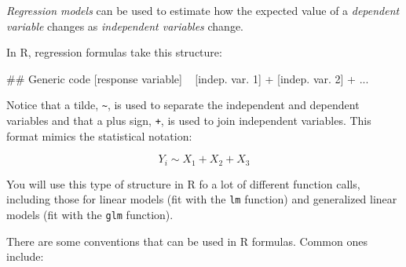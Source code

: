 \documentclass[]{book}
\makeatletter
\newenvironment{Shaded}{\begin{snugshade}}{\end{snugshade}}
\newcommand{\DecValTok}[1]{\textcolor[rgb]{0.00,0.00,0.81}{{#1}}}
\newcommand{\StringTok}[1]{\textcolor[rgb]{0.31,0.60,0.02}{{#1}}}
\newcommand{\NormalTok}[1]{{#1}}
\newenvironment{kframe}{%
\medskip{}
\setlength{\fboxsep}{.8em}
 \def\at@end@of@kframe{}%
 \ifinner\ifhmode%
  \def\at@end@of@kframe{\end{minipage}}%
  \begin{minipage}{\columnwidth}%
 \fi\fi%
 \def\FrameCommand##1{\hskip\@totalleftmargin \hskip-\fboxsep
 \colorbox{shadecolor}{##1}\hskip-\fboxsep
     \hskip-\linewidth \hskip-\@totalleftmargin \hskip\columnwidth}%
 \MakeFramed {\advance\hsize-\width
   \@totalleftmargin\z@ \linewidth\hsize
   \@setminipage}}%
 {\par\unskip\endMakeFramed%
 \at@end@of@kframe}
\renewenvironment{Shaded}{\begin{kframe}}{\end{kframe}}
\makeatother
\begin{document}
\emph{Regression models} can be used to estimate how the expected value
of a \emph{dependent variable} changes as \emph{independent variables}
change. \medskip

In R, regression formulas take this structure:

\begin{Shaded}
\begin{Highlighting}[]
\NormalTok{## Generic code}
\NormalTok{[response variable] ~}\StringTok{ }\NormalTok{[indep. var. }\DecValTok{1}\NormalTok{] +}\StringTok{  }\NormalTok{[indep. var. }\DecValTok{2}\NormalTok{] +}\StringTok{ }\NormalTok{...}
\end{Highlighting}
\end{Shaded}

Notice that a tilde, \texttt{\textasciitilde{}}, is used to separate the
independent and dependent variables and that a plus sign, \texttt{+}, is
used to join independent variables. This format mimics the statistical
notation:

\[
Y_i \sim X_1 + X_2 + X_3
\]

You will use this type of structure in R fo a lot of different function
calls, including those for linear models (fit with the \texttt{lm}
function) and generalized linear models (fit with the \texttt{glm}
function).

There are some conventions that can be used in R formulas. Common ones
include:
\end{document}
